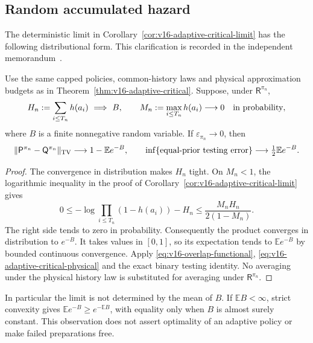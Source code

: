 \subsection{Random accumulated hazard}
The deterministic limit in Corollary~\ref{cor:v16-adaptive-critical-limit}
has the following distributional form. This clarification is recorded
in the independent memorandum~\cite[Section 4.4]{A2ReviewV16}.

\begin{corollary}
\label{cor:v17-random-hazard}
Use the same capped policies, common-history laws and physical
approximation budgets as in Theorem~\ref{thm:v16-adaptive-critical}.
Suppose, under $\mathsf R^{\pi_n}$,
\[
 H_n:=\sum_{i\le T_n}h(a_i)\ \Longrightarrow\ B,
 \qquad M_n:=\max_{i\le T_n}h(a_i)\longrightarrow0
                  \quad\hbox{in probability},
\]
where $B$ is a finite nonnegative random variable. If
$\varepsilon_{\pi_n}\to0$, then
\[
 \|\mathsf P^{\pi_n}-\mathsf Q^{\pi_n}\|_{\rm TV}
       \longrightarrow 1-\mathbb E e^{-B},
 \qquad \inf\{\text{equal-prior testing error}\}
       \longrightarrow \tfrac12\mathbb E e^{-B}.
\]
\end{corollary}
\begin{proof}
The convergence in distribution makes $H_n$ tight. On $M_n<1$, the
logarithmic inequality in the proof of
Corollary~\ref{cor:v16-adaptive-critical-limit} gives
\[
 0\le-\log\prod_{i\le T_n}(1-h(a_i))-H_n
                   \le\frac{M_nH_n}{2(1-M_n)}.
\]
The right side tends to zero in probability. Consequently the product
converges in distribution to $e^{-B}$. It takes values in $[0,1]$,
so its expectation tends to $\mathbb E e^{-B}$ by bounded continuous
convergence. Apply \eqref{eq:v16-overlap-functional},
\eqref{eq:v16-adaptive-critical-physical} and the exact binary testing
identity. No averaging under the physical history law is substituted
for averaging under $\mathsf R^{\pi_n}$.
\end{proof}

In particular the limit is not determined by the mean of $B$. If
$\mathbb EB<\infty$, strict convexity gives
$\mathbb E e^{-B}\ge e^{-\mathbb EB}$, with equality only when $B$
is almost surely constant. This observation does not assert optimality
of an adaptive policy or make failed preparations free.
